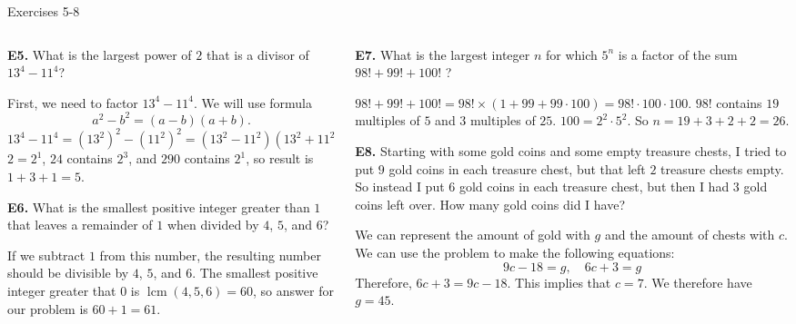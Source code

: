 \documentclass[9pt,aspectratio=169]{beamer}
\DeclareMathOperator{\lcm}{lcm}
\begin{document}
\begin{frame}{Exercises 5-8}
  \begin{columns}[T]
    \begin{column}{0.5\textwidth}
      \begin{problem}
        \textbf{E5.} What is the largest power of $2$ that is a divisor of $13^4 - 11^4$?
      \end{problem}
      First, we need to factor $13^4 - 11^4$. We will use formula 
      \[a^2 - b^2 = (a - b)(a + b). \]
      $13^4 - 11^4 = (13^2)^2 - (11^2)^2 = (13^2 - 11^2)(13^2 + 11^2) = (13 - 11)(13 + 11)(13^2 + 11^2) = 2 \times 24 \times (169 + 121) = 2 \times 24 \times 290.$
      $2 = 2^1$, $24$ contains $2^3$, and $290$ contains $2^1$, so result is $1 + 3 + 1 = 5$.
      \begin{problem}
        \textbf{E6.} What is the smallest positive integer greater than $1$ that leaves a remainder of $1$ when divided by $4$, $5$, and $6$?
      \end{problem}
      If we subtract $1$ from this number, the resulting number should be divisible by $4$, $5$, and $6$. The smallest positive integer greater that $0$ is $\lcm(4, 5, 6) = 60$, so answer for our problem is $60 + 1 = \boxed{61}$.
    \end{column}
    \begin{column}{0.5\textwidth}
      \begin{problem}
        \textbf{E7.} What is the largest integer $n$ for which $5^n$ is a factor of the sum $98!+99!+100!$ ?
      \end{problem}
      $98! + 99! + 100! = 98! \times (1 + 99 + 99 \cdot 100) = 98! \cdot 100 \cdot 100$. $98!$ contains $19$ multiples of $5$ and $3$ multiples of $25$. $100 = 2^2 \cdot 5^2$. So $n = 19 + 3 + 2 + 2 = \boxed{26}$. 
      \begin{problem}
        \textbf{E8.} Starting with some gold coins and some empty treasure chests, I tried to put $9$ gold coins in each treasure chest, but that left $2$ treasure chests empty. So instead I put $6$ gold coins in each treasure chest, but then I had $3$ gold coins left over. How many gold coins did I have?
      \end{problem}
      We can represent the amount of gold with $g$ and the amount of chests with $c$. We can use the problem to make the following equations:
      \[9c-18 = g,\quad 6c+3 = g\]
      Therefore, $6c+3 = 9c-18.$ This implies that $c = 7.$ We therefore have $g = \boxed{45}.$
    \end{column}
  \end{columns}
\end{frame}
\end{document}
